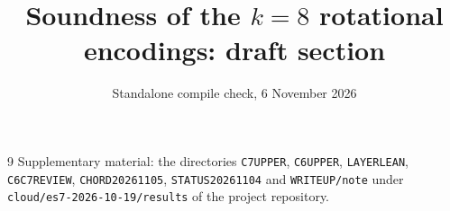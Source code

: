 \documentclass[10pt]{amsart}
\title{Soundness of the \texorpdfstring{$k=8$}{k=8} rotational encodings: draft section}
\date{Standalone compile check, 6 November 2026}
\theoremstyle{definition}
\theoremstyle{remark}
\newcommand{\dirn}[1]{{\upshape\nolinkurl{#1}}}
\begin{document}
\maketitle



\begin{thebibliography}{9}\footnotesize
{} Supplementary material: the directories \dirn{C7UPPER}, \dirn{C6UPPER}, \dirn{LAYERLEAN},
\dirn{C6C7REVIEW}, \dirn{CHORD20261105}, \dirn{STATUS20261104} and \dirn{WRITEUP/note} under
\dirn{cloud/es7-2026-10-19/results} of the project repository.
\end{thebibliography}
\end{document}
